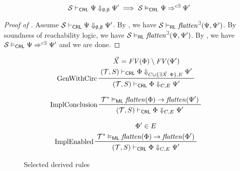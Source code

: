 \begin{theorem}\label{thm:proofsystemSoundness}
\begin{equation*}
    \mathcal{S} \vdash_{\mathsf{CRL}} \Psi \Downarrow_{\emptyset,\emptyset} \Psi^\prime \implies
    \mathcal{S} \vDash_{\mathsf{CRL}} \Psi \Rightarrow^{c\exists} \Psi^\prime
\end{equation*}
\end{theorem}
\begin{proof}[Proof of ]
Assume $\mathcal{S} \vdash_{\mathsf{CRL}} \Psi \Downarrow_{\emptyset,\emptyset} \Psi^\prime$.
By , we have $\mathcal{S} \vdash_{\mathsf{RL}} \mathit{flatten}^\exists(\Psi, \Psi^\prime)$.
By soundness of reachability logic, we have $\mathcal{S} \vDash_{\mathsf{RL}} \mathit{flatten}^\exists(\Psi, \Psi^\prime)$.
By , 
we have $\mathcal{S} \vDash_{\mathsf{CRL}} \Psi \Rightarrow^{c\exists} \Psi^\prime$ and we are done.
\end{proof}

\begin{figure}
  \begin{align*}
    & \prftree[l]{GenWithCirc}
      { \prfStackPremises
        { \vec{X} = \mathit{FV}(\Phi) \setminus \mathit{FV}(\Psi^\prime)
        }
        {(\mathcal{T}, S) \vdash_\CRL \Phi \Downarrow_{C \cup \{ \exists \vec{X}.\, \Phi  \}, E} \Psi^\prime}
      }
      {(\mathcal{T}, S) \vdash_\CRL \Phi \Downarrow_{C, E} \Psi^\prime}
  \end{align*}

  \begin{align*}
    & \prftree[l]{ImplConclusion}
      {\mathcal{T}^* \vDash_\ML \mathit{flatten}(\Phi) \rightarrow \mathit{flatten}(\Psi^\prime)}
      {(\mathcal{T}, S) \vdash_\CRL \Phi \Downarrow_{C, E} \Psi^\prime}
  \end{align*}


  \begin{align*}
    & \prftree[l]{ImplEnabled}
      { \prfStackPremises
        { \Phi^\prime \in E }
        {\mathcal{T}^* \vDash_\ML \mathit{flatten}(\Phi) \rightarrow \mathit{flatten}(\Phi^\prime)}
      }
      {(\mathcal{T}, S) \vdash_\CRL \Phi \Downarrow_{C, E} \Psi^\prime}
  \end{align*}

  \caption{Selected derived rules}
  \label{fig:CRLderivedRules}
\end{figure}